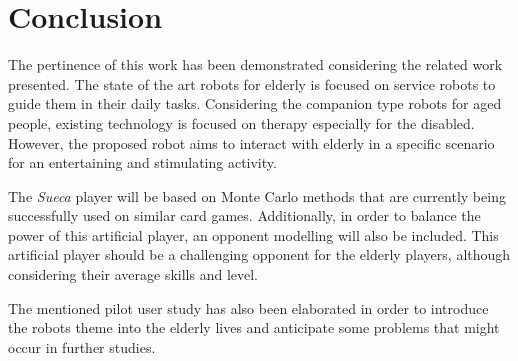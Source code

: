 \section{Conclusion} \label{sec:conclusion}

The pertinence of this work has been demonstrated considering the related work presented.
The state of the art robots for elderly is focused on service robots to guide them in their daily tasks.
Considering the companion type robots for aged people, existing technology is focused on therapy especially for the disabled.
However, the proposed robot aims to interact with elderly in a specific scenario for an entertaining and stimulating activity.

The \emph{Sueca} player will be based on Monte Carlo methods that are currently being successfully used on similar card games.
Additionally, in order to balance the power of this artificial player, an opponent modelling will also be included.
This artificial player should be a challenging opponent for the elderly players, although considering their average skills and level.

The mentioned pilot user study has also been elaborated in order to introduce the robots theme into the elderly lives and anticipate some problems that might occur in further studies.
